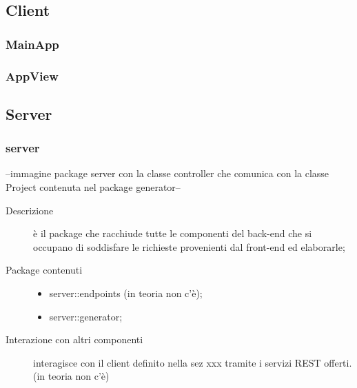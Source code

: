 





\subsection{Client}

\subsubsection{MainApp}

\subsubsection{AppView}





\subsection{Server}
\subsubsection{server}
--immagine package server con la classe controller che comunica con la classe Project contenuta nel package generator--
\begin{description}
\item[Descrizione] è il package che racchiude tutte le componenti del back-end che si occupano di soddisfare le richieste provenienti dal front-end ed elaborarle;
\item[Package contenuti] 
	\begin{itemize}
	\item server::endpoints (in teoria non c'è);
	\item server::generator;
	\end{itemize}
\item[Interazione con altri componenti] interagisce con il client definito nella sez xxx tramite i servizi REST offerti. (in teoria non c'è)
\end{description}

